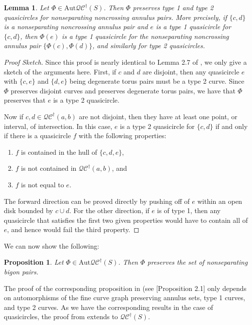 \documentclass[12pt,a4paper]{amsart}
\theoremstyle{definition}
\theoremstyle{plain}
\newtheorem{proposition}[theorem]{Proposition}
\newtheorem{lemma}[theorem]{Lemma}
\numberwithin{equation}{section}
\newcommand{\qcg}{\mathcal{QC}^{\dagger}}
\newcommand{\Aut}{\mathrm{Aut}}
\begin{document}
\begin{lemma}\label{Lem:Type1Type2Preserved}
    Let $\Phi \in \Aut \qcg(S)$. Then $\Phi$ preserves type 1
and type 2 quasicircles for nonseparating noncrossing annulus pairs. More precisely, if $\{c, d\}$ is a
nonseparating noncrossing annulus pair and $e$ is a type 1 quasicircle for $\{c, d\}$, then $\Phi(e)$ is a type
1 quasicircle for the nonseparating noncrossing annulus pair $\{\Phi(c), \Phi(d)\}$, and similarly for type
2 quasicircles.
\end{lemma}


\begin{proof}[Proof Sketch]
Since this proof is nearly identical to Lemma 2.7 of \cite{long2023automorphisms}, we only give a sketch of the arguments here. 
    First, if $c$ and $d$ are disjoint, then any quasicircle $e$ with $\{c,e\}$ and $\{d,e\}$ being degenerate torus pairs must be a type 2 curve. Since $\Phi$ preserves disjoint curves and preserves degenerate torus pairs, we have that $\Phi$ preserves that $e$ is a type 2 quasicircle.

    Now if $c,d \in \qcg(a,b)$ are not disjoint, then they have at least one point, or interval, of intersection.
    In this case, $e$ is a type 2 quasicircle for $\{c,d\}$ if and only if there is a quasicircle $f$ with the following properties: 
    \begin{enumerate}
        \item $f$ is contained in the hull of $\{c,d,e\}$,
        \item $f$ is not contained in $\qcg(a,b)$, and
        \item $f$ is not equal to $e$.
    \end{enumerate}
    The forward direction can be proved directly by pushing off of $e$ within an open disk bounded by $c\cup d$. For the other
    direction, if $e$ is of type 1, then any quasicircle that satisfies the first
    two given properties would have to contain all of $e$, and hence would fail the third property. 
\end{proof}

We can now show the following:

\begin{proposition}\label{Prop:BigonPairsPreserved}
    Let $\Phi \in \Aut\qcg(S)$. Then $\Phi$ preserves the set of nonseparating bigon pairs.
\end{proposition}


    The proof of the corresponding proposition in \cite{long2023automorphisms} (see [Proposition 2.1] only depends on automorphisms of the fine curve graph preserving annulus sets, type 1 curves, and type 2 curves.
As we have the corresponding results in the case of quasicircles, the proof from \cite{long2023automorphisms} extends to $\qcg(S)$. 
\end{document}
